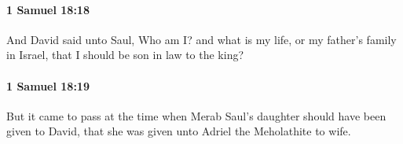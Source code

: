 		\paragraph{1 Samuel 18:18} %
			\label{1SAMUEL-18-18}

			And David said unto Saul, Who am I? and what is my life, or my father’s family in Israel, that I should be son in law to the king?


		\paragraph{1 Samuel 18:19} %
			\label{1SAMUEL-18-19}

			But it came to pass at the time when Merab Saul’s daughter should have been given to David, that she was given unto Adriel the Meholathite to wife.


